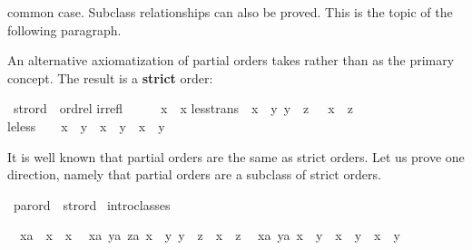 \begin{isabellebody}
\begin{isamarkuptext}
common case.  Subclass relationships can also be proved.  
This is the topic of the following
paragraph.%
\end{isamarkuptext}%
\isamarkuptrue%
%
\isamarkuptrue%
%
\begin{isamarkuptext}%
An alternative axiomatization of partial orders takes \isa{{\isacharless}{\isacharless}} rather than
\isa{{\isacharless}{\isacharless}{\isacharequal}} as the primary concept. The result is a \textbf{strict} order:%
\end{isamarkuptext}%
\isamarkuptrue%
\ strord\ {\isacharless}\ ordrel\isanewline
irrefl{\isacharcolon}\ \ \ \ \ {\isachardoublequote}{\isasymnot}\ x\ {\isacharless}{\isacharless}\ x{\isachardoublequote}\isanewline
less{\isacharunderscore}trans{\isacharcolon}\ {\isachardoublequote}{\isasymlbrakk}\ x\ {\isacharless}{\isacharless}\ y{\isacharsemicolon}\ y\ {\isacharless}{\isacharless}\ z\ {\isasymrbrakk}\ {\isasymLongrightarrow}\ x\ {\isacharless}{\isacharless}\ z{\isachardoublequote}\isanewline
le{\isacharunderscore}less{\isacharcolon}\ \ \ \ {\isachardoublequote}x\ {\isacharless}{\isacharless}{\isacharequal}\ y\ {\isacharequal}\ {\isacharparenleft}x\ {\isacharless}{\isacharless}\ y\ {\isasymor}\ x\ {\isacharequal}\ y{\isacharparenright}{\isachardoublequote}\isamarkupfalse%
%
\begin{isamarkuptext}%
\noindent
It is well known that partial orders are the same as strict orders. Let us
prove one direction, namely that partial orders are a subclass of strict
orders.%
\end{isamarkuptext}%
\isamarkuptrue%
\ parord\ {\isacharless}\ strord\isanewline
\isamarkupfalse%
\ intro{\isacharunderscore}classes\isamarkupfalse%
%
\begin{isamarkuptxt}%
\noindent
\begin{isabelle}%
\ {}{\isachardot}\ {\isasymAnd}x{\isasymColon}{\isacharprime}a{\isachardot}\ {\isasymnot}\ x\ {\isacharless}{\isacharless}\ x\isanewline
\ {}{\isachardot}\ {\isasymAnd}{\isacharparenleft}x{\isasymColon}{\isacharprime}a{\isacharparenright}\ {\isacharparenleft}y{\isasymColon}{\isacharprime}a{\isacharparenright}\ z{\isasymColon}{\isacharprime}a{\isachardot}\ {\isasymlbrakk}x\ {\isacharless}{\isacharless}\ y{\isacharsemicolon}\ y\ {\isacharless}{\isacharless}\ z{\isasymrbrakk}\ {\isasymLongrightarrow}\ x\ {\isacharless}{\isacharless}\ z\isanewline
\ {}{\isachardot}\ {\isasymAnd}{\isacharparenleft}x{\isasymColon}{\isacharprime}a{\isacharparenright}\ y{\isasymColon}{\isacharprime}a{\isachardot}\ {\isacharparenleft}x\ {\isacharless}{\isacharless}{\isacharequal}\ y{\isacharparenright}\ {\isacharequal}\ {\isacharparenleft}x\ {\isacharless}{\isacharless}\ y\ {\isasymor}\ x\ {\isacharequal}\ y{\isacharparenright}\isanewline

\end{isabelle}
\end{isamarkuptxt}
\end{isabellebody}
